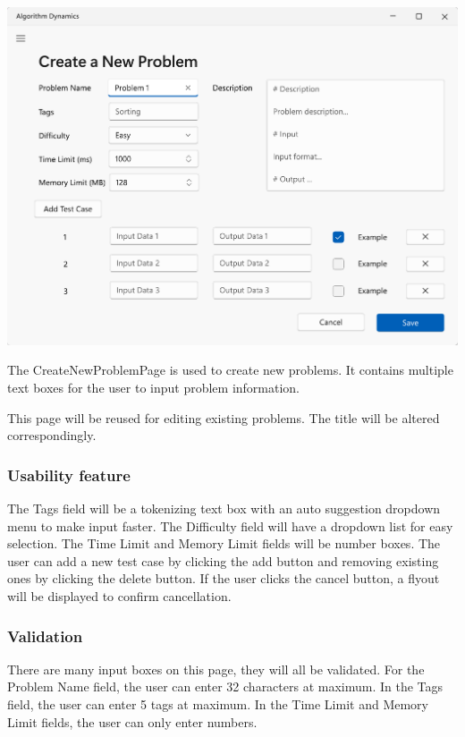 \documentclass[a4paper]{report}
\begin{document}
\includegraphics[width=\textwidth, height=\textheight, keepaspectratio]{CreateNewProblemPage-design}

The CreateNewProblemPage is used to create new problems. It contains multiple text boxes for the user to input problem information.

This page will be reused for editing existing problems. The title will be altered correspondingly.

\subsubsection{Usability feature}

The Tags field will be a tokenizing text box with an auto suggestion dropdown menu to make input faster. The Difficulty field will have a dropdown list for easy selection. The Time Limit and Memory Limit fields will be number boxes. The user can add a new test case by clicking the add button and removing existing ones by clicking the delete button. If the user clicks the cancel button, a flyout will be displayed to confirm cancellation.

\subsubsection{Validation}

There are many input boxes on this page, they will all be validated. For the Problem Name field, the user can enter 32 characters at maximum. In the Tags field, the user can enter 5 tags at maximum. In the Time Limit and Memory Limit fields, the user can only enter numbers.
\end{document}
